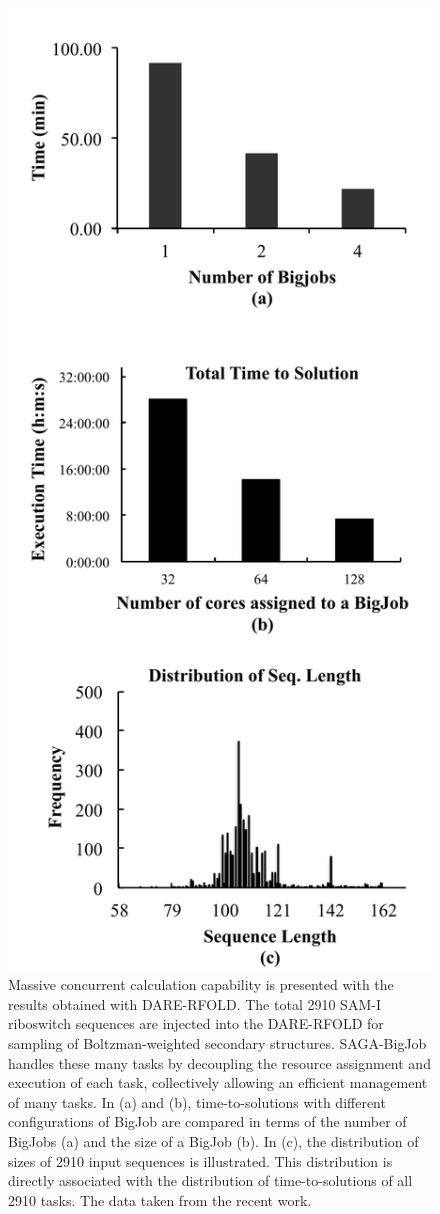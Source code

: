 \documentclass{sig-alternate}
\begin{document}
\begin{figure}
 \centering
\includegraphics[scale=0.40]{figures/dare-rfold-result.pdf}
\caption{\small Massive concurrent calculation capability is presented with the results obtained with DARE-RFOLD. The total 2910 SAM-I riboswitch sequences are injected into the DARE-RFOLD for sampling of Boltzman-weighted secondary structures.  SAGA-BigJob handles these many tasks by decoupling the resource assignment and execution of each task, collectively allowing an efficient management of many tasks. In (a) and (b), time-to-solutions with different configurations of BigJob are compared in terms of the number of BigJobs (a) and the size of a BigJob (b).  In (c), the distribution of sizes of 2910 input sequences is illustrated.  This distribution is directly associated with the distribution of time-to-solutions of all 2910 tasks. The data taken from the recent work\cite{ccpe11}.}

\end{figure}
\end{document}
